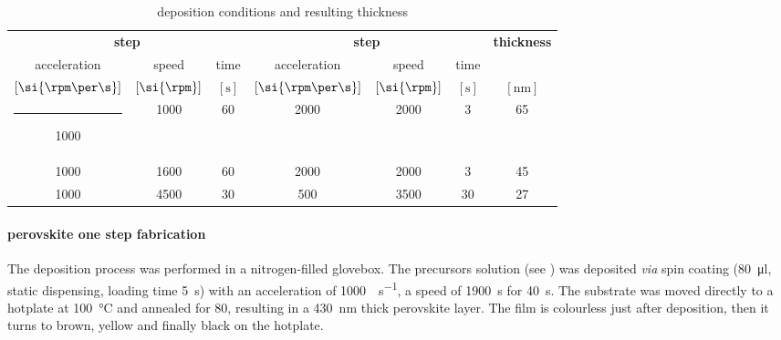 		\begin{table}%
			\caption{ deposition conditions and resulting thickness}\label{table:pedotpss_thickness}
			\begin{center}
				\begin{tabular}{c c c | c c c | c}
					\multicolumn{3}{c|}{\textbf{\nth{1} step}} & \multicolumn{3}{c|}{\textbf{\nth{2} step}} & \multirow{2}{*}{\textbf{thickness}}                                                                    \\
					acceleration                               & speed                                      & time                                & acceleration        & speed         & time        &              \\
					$[\si{\rpm\per\s}]$                        & $[\si{\rpm}]$                              & $[\si{\s}]$                         & $[\si{\rpm\per\s}]$ & $[\si{\rpm}]$ & $[\si{\s}]$ & $[\si{\nm}]$ \\[1mm]
					\hline
					\rule[0ex]{-4pt}{3ex}
					1000                                       & 1000                                       & 60                                  & 2000                & 2000          & 3           & 65           \\
					1000                                       & 1600                                       & 60                                  & 2000                & 2000          & 3           & 45           \\
					1000                                       & 4500                                       & 30                                  & 500                 & 3500          & 30          & 27           \\
				\end{tabular}
			\end{center}
		\end{table}

		\paragraph{ perovskite one step fabrication}
		The deposition process was performed in a nitrogen-filled glovebox.
		The precursors solution (see ) was deposited \textsl{via} spin coating (\SI{80}{\ul}, static dispensing, loading time \SI{5}{\s}) with an acceleration of \SI{1000}{\rpm\per\s}, a speed of \SI{1900}{\s} for \SI{40}{\s}.
		The substrate was moved directly to a hotplate at \SI{100}{\celsius} and annealed for \SI{80}{\min}, resulting in a \SI{430}{\nm} thick perovskite layer.
		The film is colourless just after deposition, then it turns to brown, yellow and finally black on the hotplate.

